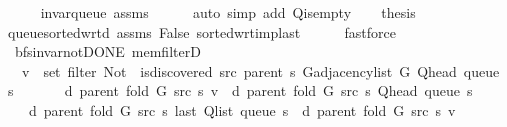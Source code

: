 \begin{isabellebody}
\ \ \ \ \isamarkupfalse%
\ invar{\isacharunderscore}{\kern0pt}queue\ assms\isanewline
\ \ \ \ \isamarkupfalse%
\ {\isacharparenleft}{\kern0pt}auto\ simp\ add{\isacharcolon}{\kern0pt}\ Q{\isachardot}{\kern0pt}is{\isacharunderscore}{\kern0pt}empty{\isacharparenright}{\kern0pt}\isanewline
\ \ \isamarkupfalse%
\ {\isacharquery}{\kern0pt}thesis\isanewline
\ \ \ \ \isamarkupfalse%
\ queue{\isacharunderscore}{\kern0pt}sorted{\isacharunderscore}{\kern0pt}wrt{\isacharunderscore}{\kern0pt}d\ assms\ False\ sorted{\isacharunderscore}{\kern0pt}wrt{\isacharunderscore}{\kern0pt}imp{\isacharunderscore}{\kern0pt}last\isanewline
\ \ \ \ \isamarkupfalse%
\ fastforce\isanewline
{}\isamarkupfalse%
%
\endisatagproof
{\isafoldproof}%
%
\isadelimproof
\isanewline
%
\endisadelimproof
\isanewline
{}\isamarkupfalse%
\ {\isacharparenleft}{\kern0pt}\ bfs{\isacharunderscore}{\kern0pt}invar{\isacharunderscore}{\kern0pt}not{\isacharunderscore}{\kern0pt}DONE{\isacharparenright}{\kern0pt}\ mem{\isacharunderscore}{\kern0pt}filterD{\isacharcolon}{\kern0pt}\isanewline
\ \ \ {\isachardoublequoteopen}v\ {\isasymin}\ set\ {\isacharparenleft}{\kern0pt}filter\ {\isacharparenleft}{\kern0pt}Not\ {\isasymcirc}\ is{\isacharunderscore}{\kern0pt}discovered\ src\ {\isacharparenleft}{\kern0pt}parent\ s{\isacharparenright}{\kern0pt}{\isacharparenright}{\kern0pt}\ {\isacharparenleft}{\kern0pt}G{\isachardot}{\kern0pt}adjacency{\isacharunderscore}{\kern0pt}list\ G\ {\isacharparenleft}{\kern0pt}Q{\isacharunderscore}{\kern0pt}head\ {\isacharparenleft}{\kern0pt}queue\ s{\isacharparenright}{\kern0pt}{\isacharparenright}{\kern0pt}{\isacharparenright}{\kern0pt}{\isacharparenright}{\kern0pt}{\isachardoublequoteclose}\isanewline
\ \ \isanewline
\ \ \ \ {\isachardoublequoteopen}d\ {\isacharparenleft}{\kern0pt}parent\ {\isacharparenleft}{\kern0pt}fold\ G\ src\ s{\isacharparenright}{\kern0pt}{\isacharparenright}{\kern0pt}\ v\ {\isacharequal}{\kern0pt}\ d\ {\isacharparenleft}{\kern0pt}parent\ {\isacharparenleft}{\kern0pt}fold\ G\ src\ s{\isacharparenright}{\kern0pt}{\isacharparenright}{\kern0pt}\ {\isacharparenleft}{\kern0pt}Q{\isacharunderscore}{\kern0pt}head\ {\isacharparenleft}{\kern0pt}queue\ s{\isacharparenright}{\kern0pt}{\isacharparenright}{\kern0pt}\ {\isacharplus}{\kern0pt}\ {}{\isachardoublequoteclose}\isanewline
\ \ \ \ {\isachardoublequoteopen}d\ {\isacharparenleft}{\kern0pt}parent\ {\isacharparenleft}{\kern0pt}fold\ G\ src\ s{\isacharparenright}{\kern0pt}{\isacharparenright}{\kern0pt}\ {\isacharparenleft}{\kern0pt}last\ {\isacharparenleft}{\kern0pt}Q{\isacharunderscore}{\kern0pt}list\ {\isacharparenleft}{\kern0pt}queue\ s{\isacharparenright}{\kern0pt}{\isacharparenright}{\kern0pt}{\isacharparenright}{\kern0pt}\ {\isasymle}\ d\ {\isacharparenleft}{\kern0pt}parent\ {\isacharparenleft}{\kern0pt}fold\ G\ src\ s{\isacharparenright}{\kern0pt}{\isacharparenright}{\kern0pt}\ v{\isachardoublequoteclose}\isanewline

\end{isabellebody}
